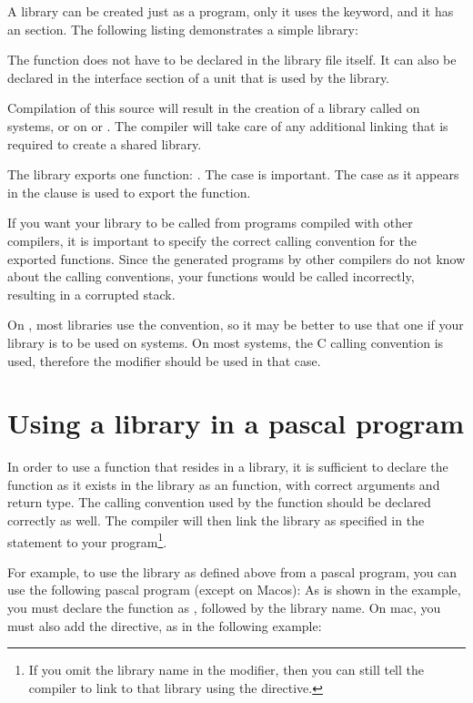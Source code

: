 A library can be created just as a program, only it uses the 
keyword, and it has an  section. The following listing
demonstrates a simple library:


The function  does not have to be declared in the library file
itself. It can also be declared in the interface section of a unit that
is used by the library.

Compilation of this source will result in the creation of a library called
 on \unix systems, or  on \windows or \ostwo.
The compiler will take care of any additional linking that is required to create a
shared library.

The library exports one function: . The case is important. The
case as it appears in the  clause is used to export the
function.

If you want your library to be called from programs compiled with
other compilers, it is important to specify the correct calling
convention for the exported functions. Since the generated programs
by other compilers do not know about the \fpc calling conventions,
your functions would be called incorrectly, resulting in a corrupted
stack.


On \windows, most libraries use the  convention, so it may be
better to use that one if your library is to be used on \windows systems. On
most \unix systems, the C calling convention is used, therefore the
 modifier should be used in that case.

\section{Using a library in a pascal program}

In order to use a function that resides in a library, it is sufficient to
declare the function as it exists in the library as an 
function, with correct arguments and return type. The calling convention
used by the function should be declared correctly as well. The compiler
will then link the library as specified in the  statement
to your program\footnote{If you omit the library name in the 
modifier, then you can still tell the compiler to link to that library using
the  directive.}.

For example, to use the library as defined above from a pascal program, you can use
the following pascal program (except on Macos):
As is shown in the example, you must declare the function as ,
followed by the library name. On mac, you must also add the
 directive, as in the following example:


